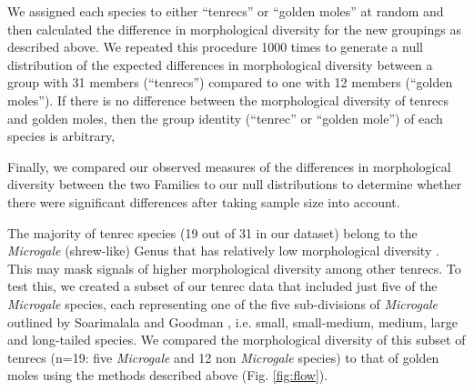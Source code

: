 \documentclass[12pt,a4paper]{article}
\begin{document}
	We assigned each species to either ``tenrecs'' or ``golden moles'' at random and then calculated the difference in morphological diversity for the new groupings as described above. We repeated this procedure 1000 times to generate a null distribution of the expected differences in morphological diversity between a group with 31 members (``tenrecs'') compared to one with 12 members (``golden moles''). If there is no difference between the morphological diversity of tenrecs and golden moles, then the group identity (``tenrec'' or ``golden mole'') of each species is arbitrary, %

	Finally, we compared our observed measures of the differences in morphological diversity between the two Families to our null distributions to determine whether there were significant differences after taking sample size into account.

	
	The majority of tenrec species (19 out of 31 in our dataset) belong to the \textit{Microgale} (shrew-like) Genus that has relatively low morphological diversity \citep{Soarimalala2011, Jenkins2003}. This may mask signals of higher morphological diversity among other tenrecs. 
	To test this, we created a subset of our tenrec data that included just five of the \textit{Microgale} species, each representing one of the five sub-divisions of \textit{Microgale} outlined by Soarimalala and Goodman \citeyearpar{Soarimalala2011}, i.e. small, small-medium, medium, large and long-tailed species. We compared the morphological diversity of this subset of tenrecs (n=19: five \textit{Microgale} and 12 non \textit{Microgale} species) to that of golden moles using the methods described above (Fig. \ref{fig:flow}).
	 

\end{document}
